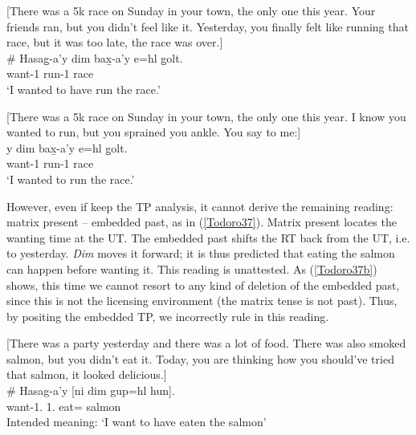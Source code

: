 \documentclass[output=paper]{langscibook}
\begin{document}
\begin{exe}
\ex \label{Todoro35}
\begin{xlist}

\ex \label{Todoro35a} [There was a 5k race on Sunday in your town, the only one this    
     year. Your friends ran, but you didn’t feel like it. Yesterday, you    
    finally felt like running that race, but it was too late, the race was    
    over.]\\
\gll \# {Hasag̱-a'}y {dim} 	{bax̱-a'y} 	{e=hl} 	{g̱olt}. \\
    {} want-1{\sg}    run-1{\sg}  	 	race	\\
\glt ‘I wanted to have run the race.’

\ex \label{Todoro35b}

\end{xlist}

\ex \label{Todoro36}

[There was a 5k race on Sunday in your town, the only one this   
         year. I know you wanted to run, but you sprained you ankle. You   
         say to me:]\\
y {dim} 	{bax̱-a'y} 	{e=hl} 	{g̱olt}. \\
    want-1{\sg}    run-1{\sg}  	 	race	\\
\glt ‘I wanted to run the race.’ 

\end{exe}

However, even if keep the TP analysis, it cannot derive the remaining reading: matrix present -- embedded past, as in (\ref{Todoro37}). Matrix present locates the wanting time at the UT. The embedded past shifts the RT back from the UT, i.e. to yesterday. \emph{Dim} moves it forward; it is thus predicted that eating the salmon can happen before wanting it. This reading is unattested. As (\ref{Todoro37b}) shows, this time we cannot resort to any kind of deletion of the embedded past, since this is not the licensing environment (the matrix tense is not past). Thus, by positing the embedded TP, we incorrectly rule in this reading. 

\begin{exe}
\ex \label{Todoro37}
\begin{xlist}

\ex \label{Todoro37a} [There was a party yesterday and there was a lot of food. There   
     was also smoked salmon, but you didn’t eat it. Today, you are thinking how you should’ve tried that salmon, it looked delicious.]\\
\gll \# {Hasag-a’y}  [{ni}	{dim} 	{gup=hl} 	{hun}].\\
    {} want-1.{\seriesII}  	1.		eat={\cn}	salmon	\\
\glt Intended meaning: ‘I want to have eaten the salmon’

\ex \label{Todoro37b}

\end{xlist}
\end{exe}
\end{document}
